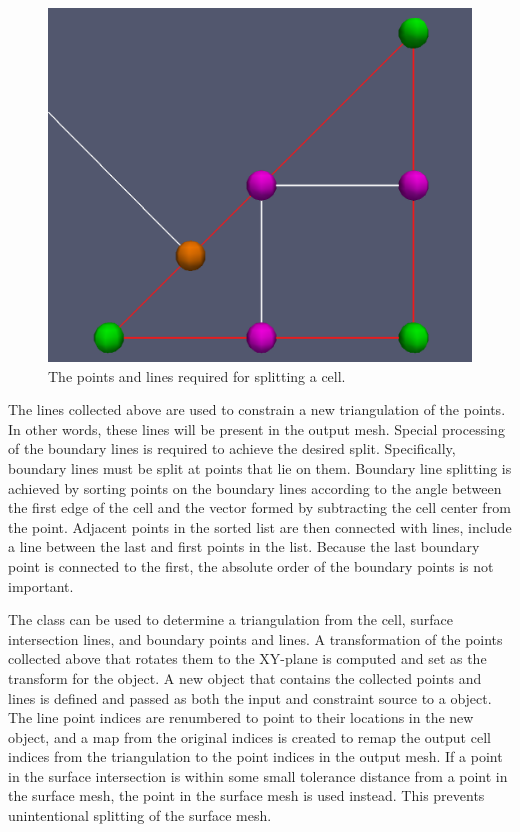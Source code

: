 \documentclass{InsightArticle}
\begin{document}
\begin{figure}
\centering
\includegraphics[scale=0.25]{Figures/CellSplitSetup}
\caption{The points and lines required for splitting a cell.}
\label{fig:CellSplitSetup}
\end{figure}

The lines collected above are used to constrain a new triangulation of the points. In other words, these lines will be present in the output mesh. Special processing of the boundary lines is required to achieve the desired split. Specifically, boundary lines must be split at points that lie on them. Boundary line splitting is achieved by sorting points on the boundary lines according to the angle between the first edge of the cell and the vector formed by subtracting the cell center from the point. Adjacent points in the sorted list are then connected with lines, include a line between the last and first points in the list. Because the last boundary point is connected to the first, the absolute order of the boundary points is not important.

The  class can be used to determine a triangulation from the cell, surface intersection lines, and boundary points and lines. A transformation of the points collected above that rotates them to the XY-plane is computed and set as the transform for the  object. A new  object that contains the collected points and lines is defined and passed as both the input and constraint source to a  object. The line point indices are renumbered to point to their locations in the new  object, and a map from the original indices is created to remap the output cell indices from the triangulation to the point indices in the output mesh. If a point in the surface intersection is within some small tolerance distance from a point in the surface mesh, the point in the surface mesh is used instead. This prevents unintentional splitting of the surface mesh.
\end{document}
